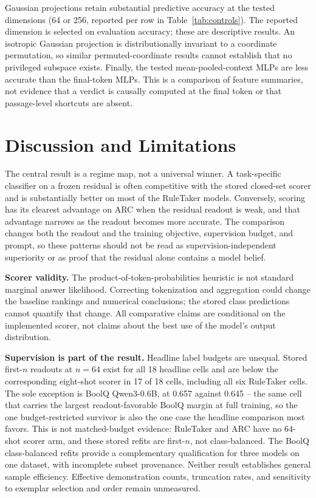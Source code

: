 Gaussian projections retain substantial predictive accuracy at the tested
dimensions (64 or 256, reported per row in Table~\ref{tab:controls}). The
reported dimension is selected on evaluation accuracy;
these are descriptive results. An isotropic Gaussian projection is
distributionally invariant to a coordinate permutation, so similar
permuted-coordinate results cannot establish that no privileged subspace
exists. Finally, the tested mean-pooled-context MLPs are less accurate
than the final-token MLPs. This is a comparison of feature summaries,
not evidence that a verdict is causally computed at the final token or
that passage-level shortcuts are absent.

\section{Discussion and Limitations}
\label{sec:discussion}
\label{sec:limits}

The central result is a regime map, not a universal winner. A task-specific
classifier on a frozen residual is often competitive with the stored
closed-set scorer and is substantially better on most of the RuleTaker
models. Conversely, scoring has its clearest advantage on ARC when the
residual readout is weak, and that advantage narrows as the readout becomes
more accurate. The comparison changes both the readout and the training
objective, supervision budget, and prompt, so these patterns should not be
read as supervision-independent superiority or as proof that the residual
alone contains a model belief.

\textbf{Scorer validity.} The product-of-token-probabilities heuristic is
not standard marginal answer likelihood. Correcting tokenization and
aggregation could change the baseline rankings and numerical conclusions;
the stored class predictions cannot quantify that change. All comparative
claims are conditional on the implemented scorer, not claims about the
best use of the model's output distribution.

\textbf{Supervision is part of the result.} Headline label budgets are unequal.
Stored first-$n$ readouts at $n=64$ exist for all 18 headline cells and are
below the corresponding eight-shot scorer in 17 of 18 cells, including all
six RuleTaker cells. The sole exception is BoolQ Qwen3-0.6B, at 0.657 against
0.645 -- the same cell that carries the largest readout-favorable BoolQ
margin at full training, so the one budget-restricted survivor is also the
one case the headline comparison most favors. This is not matched-budget
evidence: RuleTaker and ARC
have no 64-shot scorer arm, and these stored refits are first-$n$, not
class-balanced. The BoolQ class-balanced refits provide a complementary
qualification for three models on one dataset, with incomplete subset
provenance. Neither result establishes general sample efficiency.
Effective demonstration counts, truncation rates, and sensitivity to
exemplar selection and order remain unmeasured.

